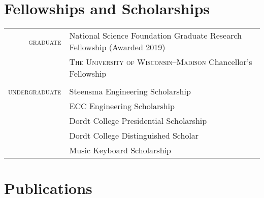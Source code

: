 \documentclass[a4paper,10pt]{article} %
\begin{document}

\section{Fellowships and Scholarships}

\begin{tabular}{rl}
\textsc{graduate} & National Science Foundation Graduate Research Fellowship (Awarded 2019) \\
& \textsc{The University of Wisconsin--Madison} Chancellor's Fellowship \\
\\
\textsc{undergraduate} & Steensma Engineering Scholarship \\
& ECC Engineering Scholarship \\
& Dordt College Presidential Scholarship \\
& Dordt College Distinguished Scholar \\
& Music Keyboard Scholarship \\
\end{tabular}







\section{Publications}
\end{document}
